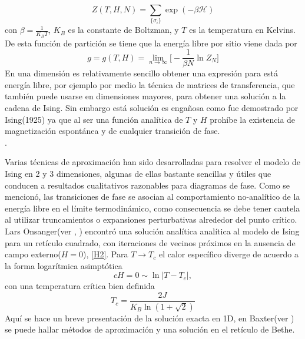 \documentclass[a4paper]{article}
\begin{document}
\begin{equation}\label{partition}
Z(T,H,N)=\sum_{\{ \sigma_i\}}\exp(-\beta \mathcal{H})
\end{equation}
con $\beta=\frac{1}{K_B T}$, $K_B$ es la constante de Boltzman, y $T$ es la temperatura en Kelvins. De esta función de partición se tiene que la energía libre por sitio viene dada por
\begin{equation}
g=g(T,H)=\lim_{n\to \infty}\Bigg[-\frac{1}{\beta N}\ln Z_N\Bigg]
\end{equation}
En una dimensión es relativamente sencillo obtener una expresión para está energía libre, por ejemplo por medio la técnica de matrices de transferencia, que también puede usarse en dimensiones mayores, para obtener una solución a la cadena de Ising. Sin embargo está solución es engañosa como fue demostrado por Ising(1925) ya que al ser una función analítica de $T$ y $H$ prohíbe la existencia de magnetización espontánea y de cualquier transición de fase.\\.

Varias técnicas de aproximación han sido desarrolladas para resolver el modelo de Ising en 2 y 3 dimensiones, algunas de ellas bastante sencillas y útiles que conducen a resultados cualitativos razonables para diagramas de fase. Como se mencionó, las transiciones de fase se asocian al comportamiento no-analítico de la energía libre en el límite termodinámico, como consecuencia se debe tener cautela al utilizar truncamientos o expansiones perturbativas alrededor del punto crítico.\\
Lars Onsanger(ver  \cite{Onsanger}, \cite{Pathria}) encontró una solución analítica analítica al modelo de Ising para un retículo cuadrado, con iteraciones de vecinos próximos en la ausencia de campo externo($H=0$), \ref{H2}. Para $T\to T_c$ el calor específico diverge de acuerdo a la forma logarítmica asimptótica
\begin{equation}
c{H=0}\sim \ln|T-T_c|,
\end{equation}
con una temperatura crítica bien definida
\begin{equation}\label{Tc}
T_c=\frac{2J}{K_B \ln(1+\sqrt{2})}
\end{equation}
Aquí se hace un breve presentación de la solución exacta en 1D, en Baxter(ver \cite{Baxter}) se puede hallar métodos de aproximación y una solución en el retículo de Bethe.
\end{document}
